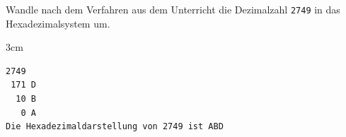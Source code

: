 \question[2]
Wandle nach dem Verfahren aus dem Unterricht die Dezimalzahl \texttt{2749} in das Hexadezimalsystem um.
\begin{solutionbox}{3cm}
\begin{lstlisting}
2749
 171 D
  10 B
   0 A
Die Hexadezimaldarstellung von 2749 ist ABD
\end{lstlisting}
\end{solutionbox}
